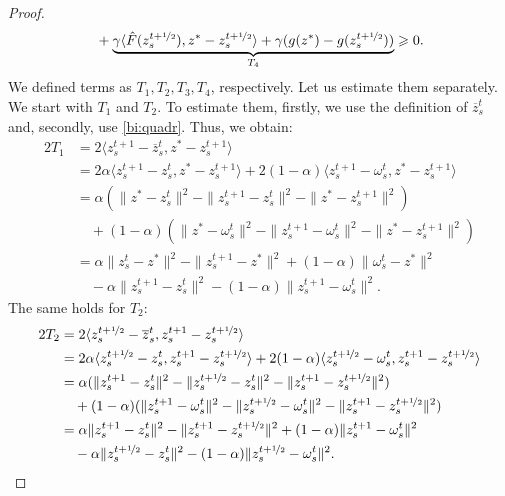 \documentclass{article}
\begin{document}
\begin{proof}
\begin{align}
            \label{t2:ineq1}
            &\quad + \underbrace{\gamma\langle \hat{F}(z_s^{t+\nicefrac{1}{2}}), z^* - z_s^{t+\nicefrac{1}{2}}\rangle + \gamma (g(z^*) - g(z_s^{t+\nicefrac{1}{2}}))}_{T_4} \geqslant 0.
        \end{align}
        We defined terms as $T_1, T_2, T_3, T_4$, respectively. Let us estimate them separately. We start with $T_1$ and $T_2$. To estimate them, firstly, we use the definition of $\overline{z}_s^t$ and, secondly, use \eqref{bi:quadr}. Thus, we obtain:
        \begin{align*}
            2T_1 &= 2\langle z_s^{t+1} - \overline{z}_s^t, z^* - z_s^{t+1}\rangle \\
            &= 2\alpha \langle z_s^{t+1} - z_s^t, z^* - z_s^{t+1}\rangle + 2(1-\alpha)\langle z_s^{t+1} - \omega_s^t, z^* - z_s^{t+1}\rangle\\
            &= \alpha (\|z^* - z_s^t\|^2 - \|z_s^{t+1} - z_s^t\|^2 - \|z^* - z_s^{t+1}\|^2) \\
            &\quad + (1-\alpha)(\|z^* - \omega_s^t\|^2 - \|z_s^{t+1} - \omega_s^t\|^2 - \|z^* - z_s^{t+1}\|^2)\\
            &= \alpha \|z_s^t - z^*\|^2 - \|z_s^{t+1} - z^*\|^2 + (1-\alpha)\|\omega_s^t - z^*\|^2 \\
            &\quad - \alpha \|z_s^{t+1} - z_s^t\|^2 - (1-\alpha) \|z_s^{t+1} - \omega_s^t\|^2.
        \end{align*}
        The same holds for $T_2$:
        \begin{align*}
            2T_2 &= 2\langle z_s^{t+\nicefrac{1}{2}} - \overline{z}_s^t, z_s^{t+1} - z_s^{t+\nicefrac{1}{2}}\rangle \\
            &= 2\alpha \langle z_s^{t+\nicefrac{1}{2}} - z_s^t, z_s^{t+1} - z_s^{t+\nicefrac{1}{2}}\rangle + 2(1-\alpha)\langle z_s^{t+\nicefrac{1}{2}} - \omega_s^t, z_s^{t+1} - z_s^{t+\nicefrac{1}{2}}\rangle\\
            &= \alpha (\|z_s^{t+1} - z_s^t\|^2 - \|z_s^{t+\nicefrac{1}{2}} - z_s^t\|^2 - \|z_s^{t+1} - z_s^{t+\nicefrac{1}{2}}\|^2) \\
            &\quad + (1-\alpha)(\|z_s^{t+1} - \omega_s^t\|^2 - \|z_s^{t+\nicefrac{1}{2}} - \omega_s^t\|^2 - \|z_s^{t+1} - z_s^{t+\nicefrac{1}{2}}\|^2)\\
            &= \alpha \|z_s^{t+1} - z_s^t\|^2 - \|z_s^{t+1} - z_s^{t+\nicefrac{1}{2}}\|^2 + (1-\alpha)\|z_s^{t+1} - \omega_s^t\|^2 \\
            &\quad - \alpha \|z_s^{t+\nicefrac{1}{2}} - z_s^t\|^2 - (1-\alpha) \|z_s^{t+\nicefrac{1}{2}} - \omega_s^t\|^2.

\end{align*}
\end{proof}
\end{document}
